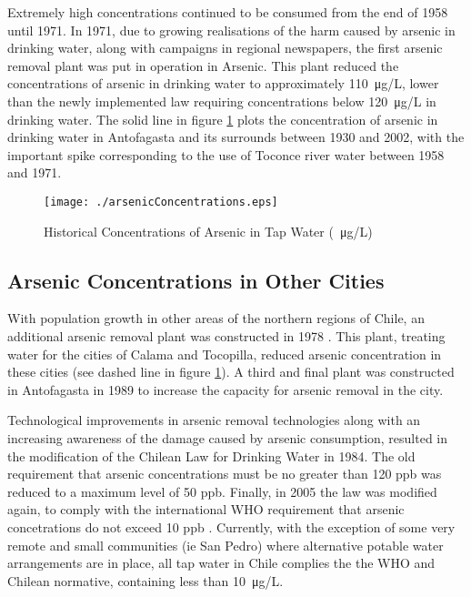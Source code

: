 \documentclass{article}[12pt,subeqn]
\begin{document}
\begin{spacing}{1.4}
Extremely high concentrations continued to be consumed from the end of
1958 until 1971.  In 1971, due to growing realisations of the harm
caused by arsenic in drinking water, along with campaigns in regional
newspapers, the first arsenic removal plant was put in operation in
Arsenic.  This plant reduced the concentrations of arsenic in drinking
water to approximately \SI{110}{\micro\gram}/L, lower than the newly
implemented law requiring concentrations below \SI{120}{\micro\gram}/L
in drinking water.  The solid line in figure \ref{ASfig:arsenic} plots
the concentration of arsenic in drinking water in Antofagasta and its
surrounds between 1930 and 2002, with the important spike
corresponding to the use of Toconce river water between 1958 and 1971.

\begin{figure}[htpb]
\texttt{[image: ./arsenicConcentrations.eps]}
\caption{Historical Concentrations of Arsenic in Tap Water (\SI{}{\micro\gram}/L)}
\label{ASfig:arsenic}
\end{figure}

\subsection{Arsenic Concentrations in Other Cities}
With population growth in other areas of the northern regions of
Chile, an additional arsenic removal plant was constructed in 1978
\citep{MainoRecabarren2012}. This plant, treating water for the cities
of Calama and Tocopilla, reduced arsenic concentration in these cities
(see dashed line in figure \ref{ASfig:arsenic}).  A third and final
plant was constructed in Antofagasta in 1989 to increase the capacity
for arsenic removal in the city.

Technological improvements in arsenic removal technologies along with
an increasing awareness of the damage caused by arsenic consumption,
resulted in the modification of the Chilean Law for Drinking Water in
1984.  The old requirement that arsenic concentrations must be no
greater than 120 ppb was reduced to a maximum level of 50
ppb. Finally, in 2005 the law was modified again, to comply with the
international WHO requirement that arsenic concetrations do not exceed
10 ppb \citep{WHO2001}.  Currently, with the exception of some very
remote and small communities (ie San Pedro) where alternative potable water
arrangements are in place, all tap water in Chile complies the the WHO
and Chilean normative, containing less than \SI{10}{\micro\gram}/L.





\end{spacing}
\end{document}
